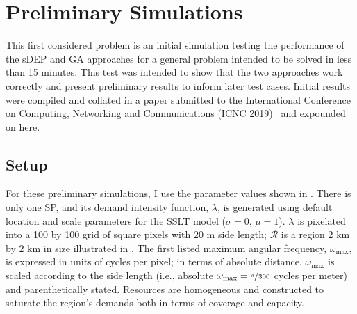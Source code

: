 \documentclass[12pt,dvipsnames]{report}
\begin{document}
\section{Preliminary Simulations} \label{sec:prelim}

This first considered problem is an initial simulation testing the performance of the sDEP and GA approaches for a general problem intended to be solved in less than 15 minutes.  This test was intended to show that the two approaches work correctly and present preliminary results to inform later test cases.  Initial results were compiled and collated in a paper submitted to the International Conference on Computing, Networking and Communications (ICNC 2019)~\cite{KTeague:BSSelection} and expounded on here.

\subsection{Setup} \label{subsec:prelim_setup}

For these preliminary simulations, I use the parameter values shown in .  There is only one SP, and its demand intensity function, $\lambda$, is generated using default location and scale parameters for the SSLT model ($\sigma = 0,\, \mu = 1$).  $\lambda$ is pixelated into a 100 by 100 grid of square pixels with 20 m side length; $\mathcal{R}$ is a region 2 km by 2 km in size illustrated in .  The first listed maximum angular frequency, $\omega_{\max}$, is expressed in units of cycles per pixel; in terms of absolute distance, $\omega_{\max}$ is scaled according to the side length (i.e., absolute $\omega_{\max} = \nicefrac{\pi}{300}$ cycles per meter) and parenthetically stated.  Resources are homogeneous and constructed to saturate the region's demands both in terms of coverage and capacity.
\end{document}
